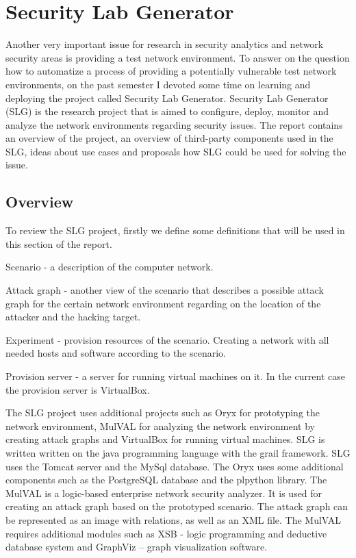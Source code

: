 %


\section{Security Lab Generator}
Another very important issue for research in security analytics and network security areas is providing a test network environment. To answer on the question how to automatize a process of providing a potentially vulnerable test network environments, on the past semester I devoted some time on learning and deploying the project called Security Lab Generator. Security Lab Generator (SLG) is the research project that is aimed to configure, deploy, monitor and analyze the network environments regarding security issues. The report contains an overview of the project, an overview of third-party components used in the SLG, ideas about use cases and proposals how SLG could be used for solving the issue.

\subsection{Overview}

To review the SLG project, firstly we define some definitions that will be used in this section of the report. 

\begin{compactitem}
\item Scenario - a description of the computer network. 
\item Attack graph - another view of the scenario that describes a possible attack graph for the certain network environment regarding on the location of the attacker and the hacking target.   
\item Experiment - provision resources of the scenario. Creating a network with all needed hosts and software according to the scenario.
\item Provision server - a server for running virtual machines on it. In the current case the provision server  is VirtualBox.
\end{compactitem}

The SLG project uses additional projects such as Oryx for prototyping the network environment, MulVAL for analyzing the network environment by creating attack graphs and VirtualBox for running virtual machines. SLG is written written on the java programming language with the grail framework. SLG uses the Tomcat server and the MySql database. The Oryx uses some additional components such as the PostgreSQL database and the plpython library. The MulVAL is a logic-based enterprise network security analyzer. It is used for creating an attack graph based on the prototyped scenario. The attack graph can be represented as an image with relations, as well as an XML file. The MulVAL requires additional modules such as XSB - logic programming and deductive database system and GraphViz – graph visualization software. 

